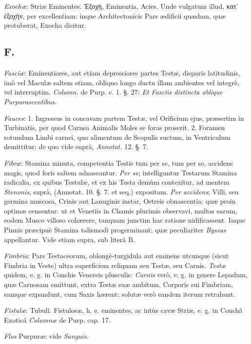 \documentclass[a4paper, 11pt, oneside, polutonikogreek, german]{article}
\begin{document}
\emph{Exochæ}: Striæ Eminentes. Ἐξοχὴ, Eminentia, Acies. Unde vulgatum illud, κατ' ἐξοχὴν, per excellentiam: inque Architectonicis Pars ædificii quædam, quæ protuberat, Exocha dicitur.

\subsection{F.}
\paragraph{}
\emph{Fasciæ}: Eminentiores, aut etiam depressiores partes Testæ, disparis latitudinis, imò vel Maculæ saltem etiam, obliquo longo ductu illam ambientes vel integrè, vel interruptim. \emph{Column.} de Purp. c. 1. §. 27: \emph{Et Fasciis distincta oblique Purpurascentibus}.

\emph{Fauces}: 1. Ingressus in concavam partem Testæ, vel Orificium ejus, præsertim in Turbinatis, per quod Carnea Animalis Moles se foras proserit. 2. Foramen rotundum Limbi carnei, quo alimentum de Scopulis suctum, in Ventriculum demittitur; de quo vide suprà, \emph{Annotat.} 12. §. 7.

\emph{Fibræ}: Stamina minuta, competentia Testis tum per se, tum per se, accidens magis, quod foris saltem adnascantur. \emph{Per se}; intelliguntur Testarum Stamina radicalia, ex quibus Testulæ, et ex his Testa demùm contexitur, ad mentem \emph{Stenonis}, suprà, (Annotat. 10. §. 7. et seq.) expositam. \emph{Per accidens}; Villi, seu germina muscosa, Crinis aut Lanuginis instar, Ostreis obnascentia; quæ proin optimæ censentur: ut et Venetiis in Chamis plurimis observavi, multas earum, eodem Musco villoso cohærere, tanquam junctim hac ratione nidificassent. Inque Pinnis præcipuè Stamina talismodi progerminant; quæ peculiariter \emph{Byssus} appellantur. Vide etiam supra, sub literâ B.

\emph{Fimbria}: Pars Testaceorum, oblongè-turgidula aut eminens utcunque (sicut Fimbria in Veste) ultra superficiem reliquam seu Testæ, seu Carnis. \emph{Testæ} quidem, e. g. in Conchis Venereis plusculis: \emph{Carnis} verò, e. g. in genere Lepadum, quæ Carnosam emittunt, extra Testæ suæ ambitum, Corporis sui Fimbriam, eamque expandunt, cum Saxis hærent; solutæ verò eandem iterum retrahunt.

\emph{Fistulæ}: Tubuli. Fistulosæ, h. e. eminentes, ac intùs cavæ Striæ, e. g. in Conchâ Exoticâ \emph{Columnæ} de Purp. cap. 17.

\emph{Flos} Purpuræ: vide \emph{Sanguis}.
\end{document}
